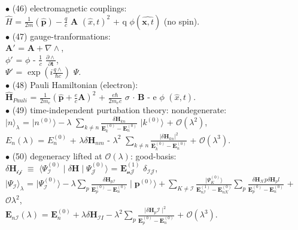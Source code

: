 \documentclass[10pt,fancy]{elegantbook}
\begin{document}
{$\bullet$ (46) electromagnetic couplings:  \\  
$\hat{H}$ = $\frac{1}{2m}(\hat{\mathbf p}) - \frac{q}{c}$ $\mathbf A$ $(\hat{x}, t)^2$ + q $\phi(\hat{\mathbf x, t})$ (no spin).  \\ 

$\bullet$ (47) gauge-tranformations:  \\  
$\mathbf A'$ = $\mathbf A + \nabla \wedge$,   \\  
$\phi'$ = $\phi$ - $\frac{1}{c}$ $ \frac{\partial \wedge}{\partial {\mathbf t}}$, \\  
$\Psi'$ = $\exp(i \frac{q \wedge}{\hbar c})$ $\Psi$.  \\

$\bullet$ (48) Pauli Hamiltonian (electron):  \\
$\hat{\mathbf H}_{Pauli}$ = $ \frac{1}{2m_e} (\hat{\mathbf p} + \frac{e}{c} \mathbf A)^2$ + $\frac{e \hbar}{2m_e c}$ $\sigma$ $\cdot$ $\mathbf B$ - e $\phi$ $(\hat x,t)$. \\

$\bullet$ (49) time-independent purtabation theory:  nondegenerate:  \\  
$\mid n \rangle_\lambda$ = $\mid n^{(0)} \rangle - \lambda$ $\sum_{k \neq n} \frac{\delta \mathbf H_{kn}} {\mathbf E^{(0)}_k - \mathbf E^{(0)}_n}$ $\mid k^{(0)} \rangle$ + $\mathcal O (\lambda^2)$,  \\    
$E_n (\lambda)$ = $ E^{(0)}_n$ + $ \lambda \delta \mathbf H_{nm}$ - $\lambda^2$ $\sum_{k \neq n} \frac{ | \delta \mathbf H_{kn} |^2} {\mathbf E^{(0)}_k - \mathbf E^{(0)}_n}$ + $\mathcal O (\lambda^3)$. \\ 

 $\bullet$ (50) degeneracy lifted at $\mathcal O (\lambda)$: good-basis: \\   
$\delta \mathbf H_{\mathcal {ij}}$ $\equiv$ $\langle \Psi^{(0)}_\mathcal I \mid \delta \mathbf H \mid \Psi^{(0)}_\mathcal J \rangle$ = $\mathbf E^{(1)}_\mathcal {nJ}$ $\delta_\mathcal {IJ}$,  \\    
$\mid \Psi_\mathcal I \rangle_\lambda$ = $\mid \Psi^{(0)}_{\mathcal I} \rangle - \lambda \sum_p \frac{\delta \mathbf H_{p \mathcal I}} {\mathbf E^{(0)}_p - \mathbf E^{(0)}_n} \mid \mathbf p^{(0)} \rangle + \sum_{K \neq \mathcal I} \frac{ \mid \Psi^{(0)}_K \rangle} {\mathbf E^{(1)}_{n \mathcal I} - \mathbf E^{(0)}_{n \mathcal K}} \sum_p \frac{ \delta \mathbf H_\mathcal K p \delta \mathbf H_pl} {\mathbf E^(0)_p - \mathbf E^(0)_n}$ + $\mathcal O \lambda^2$,  \\    
$\mathbf E_{n \mathcal I} (\lambda)$ = $\mathbf E^{(0)}_n + \lambda \delta \mathbf H_{\mathcal II} -\lambda^2 \sum_p \frac{ \mid \delta \mathbf H_p \mathcal I \mid^2}{\mathbf E^{(0)}_p - \mathbf E^{(0)}_n}$ + $\mathcal O (\lambda^3)$. \\

}
\end{document}
